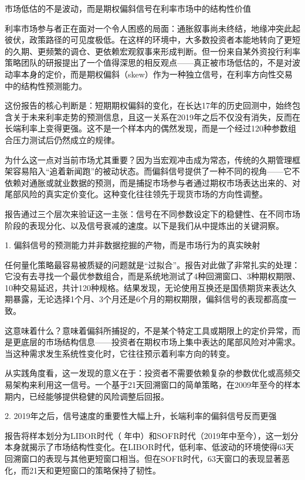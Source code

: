 \documentclass[11pt]{ctexart}
\begin{document}
市场低估的不是波动，而是期权偏斜信号在利率市场中的结构性价值

利率市场参与者正在面对一个令人困惑的局面：通胀叙事尚未终结，地缘冲突此起彼伏，政策路径的可见度极低。在这样的环境中，大多数投资者本能地转向了更短的久期、更频繁的调仓、更依赖宏观叙事来形成判断。但一份来自某外资投行利率策略团队的研报提出了一个值得深思的相反观点——真正被市场低估的，不是对波动率本身的定价，而是期权偏斜（skew）作为一种独立信号，在利率方向性交易中的结构性预测能力。

这份报告的核心判断是：短期期权偏斜的变化，在长达17年的历史回测中，始终包含关于未来利率走势的预测信息，且这一关系在2019年之后不仅没有消失，反而在长端利率上变得更强。这不是一个样本内的偶然发现，而是一个经过120种参数组合压力测试后仍然成立的规律。

为什么这一点对当前市场尤其重要？因为当宏观冲击成为常态，传统的久期管理框架容易陷入“追着新闻跑”的被动状态。而偏斜信号提供了一种不同的视角——它不依赖对通胀或就业数据的预测，而是捕捉市场参与者通过期权市场表达出来的、对尾部风险的真实定价变化。这种变化往往领先于现货市场的方向性调整。

报告通过三个层次来验证这一主张：信号在不同参数设定下的稳健性、在不同市场阶段的表现分化、以及信号衰减的速度。以下是我们从中提炼出的关键洞察。

1. 偏斜信号的预测能力并非数据挖掘的产物，而是市场行为的真实映射

任何量化策略最容易被质疑的问题就是“过拟合”。报告对此做了非常扎实的处理：它没有去寻找一个最优参数组合，而是系统地测试了4种回溯窗口、3种期权期限、10种交易延迟，共计120种规格。结果发现，无论使用互换还是国债期货来表达久期暴露，无论选择1个月、3个月还是6个月的期权期限，偏斜信号的表现都高度一致。

这意味着什么？意味着偏斜所捕捉的，不是某个特定工具或期限上的定价异常，而是更底层的市场结构信息——投资者在期权市场上集中表达的尾部风险对冲需求。当这种需求发生系统性变化时，它往往预示着利率方向的转变。

从实践角度看，这一发现的意义在于：投资者不需要依赖复杂的参数优化或高频交易架构来利用这一信号。一个基于21天回溯窗口的简单策略，在2009年至今的样本期内，已经能够提供稳健的风险调整后回报。

2. 2019年之后，信号速度的重要性大幅上升，长端利率的偏斜信号反而更强

报告将样本划分为LIBOR时代（ 年中）和SOFR时代（2019年中至今），这一划分本身就揭示了市场结构性变化。在LIBOR时代，低利率、低波动的环境使得63天回溯窗口的表现与其他更短窗口相当。但在SOFR时代，63天窗口的表现显著恶化，而21天和更短窗口的策略保持了韧性。
\end{document}
